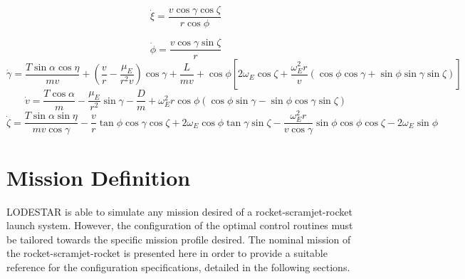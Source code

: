 \begin{equation}
\dot{\xi} = \frac{v\cos \gamma \cos \zeta}{r \cos \phi}
\end{equation}

\begin{equation}
\dot{\phi} = \frac{v\cos\gamma\sin\zeta}{r}
\end{equation}
\begin{equation}
\dot{\gamma} = \frac{T\sin\alpha \cos\eta}{mv} + (\frac{v}{r}-\frac{\mu_E}{r^2 v})\cos\gamma + \frac{L}{mv}
+ \cos\phi[2\omega_E \cos\zeta + \frac{\omega_E^2 r}{v}(\cos\phi\cos\gamma+\sin\phi\sin\gamma\sin\zeta)]
\end{equation}
\begin{equation}
\dot{v} = \frac{T\cos\alpha}{m}-\frac{\mu_E}{r^2}\sin\gamma - \frac{D}{m}
+ \omega_E^2 r\cos\phi(\cos\phi\sin\gamma-\sin\phi\cos\gamma\sin\zeta)
\end{equation}
\begin{equation}\label{eq:heading}
\dot{\zeta} = \frac{T\sin\alpha \sin\eta}{mv \cos \gamma}-\frac{v}{r}\tan\phi\cos\gamma\cos\zeta +2\omega_E\cos\phi\tan\gamma\sin\zeta - \frac{\omega_E^2 r}{v\cos\gamma}\sin\phi\cos\phi\cos\zeta-2\omega_E\sin\phi 
\end{equation}



\section{Mission Definition}\label{sec:mission}
LODESTAR is able to simulate any mission desired of a rocket-scramjet-rocket launch system. However, the configuration of the optimal control routines must be tailored towards the specific mission profile desired.
The nominal mission of the rocket-scramjet-rocket is presented here in order to provide a suitable reference for the configuration specifications, detailed in the following sections. 

